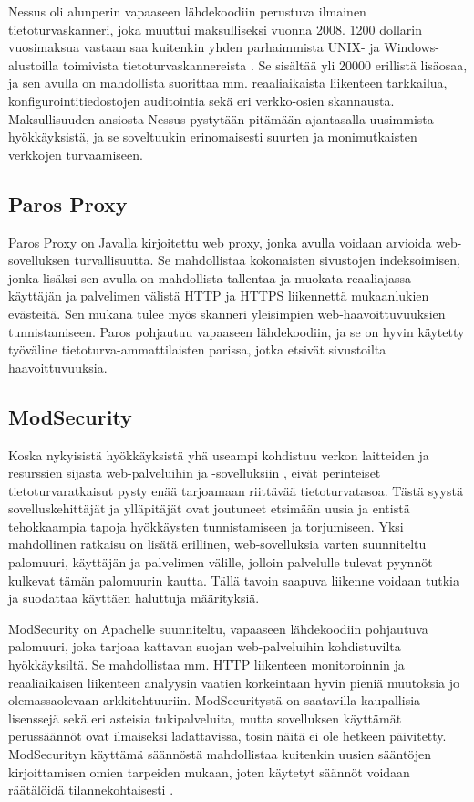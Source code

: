 Nessus \cite{Nessus} oli alunperin vapaaseen lähdekoodiin perustuva ilmainen tietoturvaskanneri, joka muuttui maksulliseksi vuonna 2008. 1200 dollarin vuosimaksua vastaan
saa kuitenkin yhden parhaimmista UNIX- ja Windows-alustoilla toimivista tietoturvaskannereista \cite{NST}. Se sisältää yli 20000 erillistä lisäosaa,
ja sen avulla on mahdollista suorittaa mm. reaaliaikaista liikenteen tarkkailua, konfigurointitiedostojen auditointia sekä eri verkko-osien skannausta. Maksullisuuden 
ansiosta Nessus pystytään pitämään ajantasalla uusimmista hyökkäyksistä, ja se soveltuukin erinomaisesti suurten ja monimutkaisten verkkojen turvaamiseen\cite{Nessus}. 

\subsection{Paros Proxy}

Paros Proxy \cite{Paros} on Javalla kirjoitettu web proxy, jonka avulla voidaan arvioida web-sovelluksen turvallisuutta. Se mahdollistaa kokonaisten sivustojen indeksoimisen,
jonka lisäksi sen avulla on mahdollista tallentaa ja muokata reaaliajassa käyttäjän ja palvelimen välistä HTTP ja HTTPS liikennettä mukaanlukien evästeitä. Sen mukana tulee
myös skanneri yleisimpien web-haavoittuvuuksien tunnistamiseen. Paros pohjautuu vapaaseen lähdekoodiin, ja se on hyvin käytetty työväline tietoturva-ammattilaisten
parissa, jotka etsivät sivustoilta haavoittuvuuksia.

\subsection{ModSecurity}

Koska nykyisistä hyökkäyksistä yhä useampi kohdistuu verkon laitteiden ja resurssien sijasta web-palveluihin ja -sovelluksiin \cite{WASCb} \cite{SYM}, eivät perinteiset
tietoturvaratkaisut pysty enää tarjoamaan riittävää tietoturvatasoa. Tästä syystä sovelluskehittäjät ja ylläpitäjät ovat joutuneet etsimään uusia ja entistä tehokkaampia 
tapoja hyökkäysten tunnistamiseen ja torjumiseen. Yksi mahdollinen ratkaisu on lisätä erillinen, web-sovelluksia varten suunniteltu palomuuri, käyttäjän ja palvelimen 
välille, jolloin palvelulle tulevat pyynnöt kulkevat tämän palomuurin kautta. Tällä tavoin saapuva liikenne voidaan tutkia ja suodattaa käyttäen haluttuja määrityksiä. 

ModSecurity \cite{Mod} on Apachelle suunniteltu, vapaaseen lähdekoodiin pohjautuva palomuuri, joka tarjoaa kattavan suojan web-palveluihin kohdistuvilta hyökkäyksiltä. 
Se mahdollistaa mm. HTTP liikenteen monitoroinnin ja reaaliaikaisen liikenteen analyysin vaatien korkeintaan hyvin pieniä muutoksia jo olemassaolevaan arkkitehtuuriin.
ModSecuritystä on saatavilla kaupallisia lisenssejä sekä eri asteisia tukipalveluita, mutta sovelluksen käyttämät perussäännöt ovat ilmaiseksi ladattavissa, tosin näitä
ei ole hetkeen päivitetty. ModSecurityn käyttämä säännöstä mahdollistaa kuitenkin uusien sääntöjen kirjoittamisen omien tarpeiden mukaan, joten käytetyt säännöt voidaan räätälöidä 
tilannekohtaisesti \cite{Mod}. 

